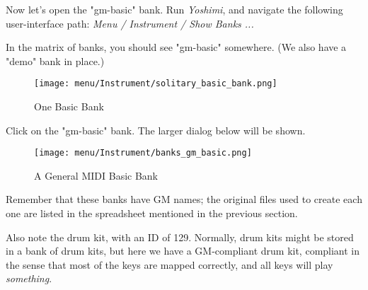    Now let's open the "gm-basic" bank.
   Run \textsl{Yoshimi}, and navigate the following user-interface path:
   \textsl{Menu / Instrument / Show Banks ...}

   In the matrix of banks, you should see "gm-basic" somewhere.
   (We also have a "demo" bank in place.)

\begin{figure}[H]
   \centering 
   \texttt{[image: menu/Instrument/solitary\_basic\_bank.png]}
   \caption{One Basic Bank}
   \label{fig:cookbook_bank_solitary_bank}
\end{figure}
   
   Click on the "gm-basic" bank.  The larger dialog below will be shown.

\begin{figure}[H]
   \centering 
   \texttt{[image: menu/Instrument/banks\_gm\_basic.png]}
   \caption{A General MIDI Basic Bank}
   \label{fig:cookbook_bank_basic_bank}
\end{figure}

Remember that these banks have GM names; the original files used to create
each one are listed in the spreadsheet mentioned in the previous section.

Also note the drum kit, with an ID of 129.  Normally, drum kits might be
stored in a bank of drum kits, but here we have a GM-compliant drum kit,
compliant in the sense that most of the keys are mapped correctly,
and all keys will play \textsl{something}.


